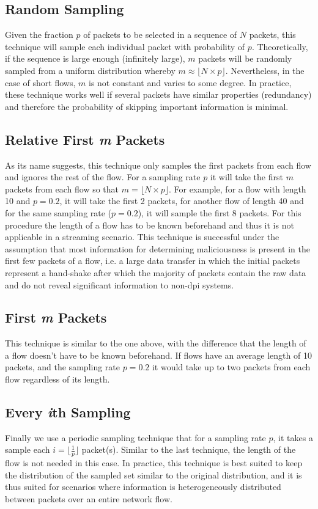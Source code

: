 \documentclass[conference]{IEEEtran}
\begin{document}
\subsection{Random Sampling}

Given the fraction $p$ of packets to be selected in a sequence of $N$ packets, this technique will sample each individual packet with probability of $p$. Theoretically, if the sequence is large enough (infinitely large), $m$ packets will be randomly sampled from a uniform distribution whereby $m \approx \lfloor N \times p \rfloor$. Nevertheless, in the case of short flows, $m$ is not constant and varies to some degree.  In practice, these technique works well if several packets have similar properties (redundancy) and therefore the probability of skipping important information is minimal.

\subsection{Relative First \emph{m} Packets}
As its name suggests, this technique only samples the first packets from each flow and ignores the rest of the flow. For a sampling rate $p$ it will take the first $m$ packets from each flow so that $m = \lfloor N \times p \rfloor$. For example, for a flow with length 10 and $p=0.2$, it will take the first 2 packets, for another flow of length 40 and for the same sampling rate ($p=0.2$), it will sample the first 8 packets. For this procedure the length of a flow has to be known beforehand and thus it is not applicable in a streaming scenario. This technique is successful under the assumption that most information for determining maliciousness is present in the first few packets of a flow, i.e. a large data transfer in which the initial packets represent a hand-shake after which the majority of packets contain the raw data and do not reveal significant information to non-\gls{dpi} systems.

\subsection{First \emph{m} Packets}
This technique is similar to the one above, with the difference that the length of a flow doesn't have to be known beforehand. If flows have an average length of 10 packets, and the sampling rate $p=0.2$ it would take up to two packets from each flow regardless of its length.

\subsection{Every \emph{i}th Sampling}
Finally we use a periodic sampling technique that for a sampling rate $p$, it takes a sample each $i= \lfloor \frac{1}{p} \rfloor$ packet(s). Similar to the last technique, the length of the flow is not needed in this case. In practice, this technique is best suited to keep the distribution of the sampled set similar to the original distribution, and it is thus suited for scenarios where information is heterogeneously distributed between packets over an entire network flow.
\end{document}
